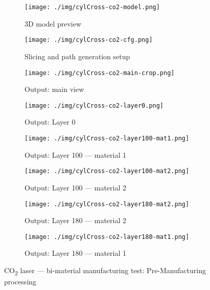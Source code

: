 \begin{figure}[htbp!]
  \centering
  \begin{subfigure}[t]{0.48\textwidth}
  \centering
  \texttt{[image: ./img/cylCross-co2-model.png]}
  \caption{3D model preview}%
  \label{fig:cylCross-co2-model}
  \end{subfigure}
%
  \begin{subfigure}[t]{0.48\textwidth}
  \centering
  \texttt{[image: ./img/cylCross-co2-cfg.png]}
  \caption{Slicing and path generation setup}%
  \label{fig:cylCross-co2-cfg}
\end{subfigure}
%
  \begin{subfigure}[t]{0.48\textwidth}
  \centering
  \texttt{[image: ./img/cylCross-co2-main-crop.png]}
  \caption{Output: main view}%
  \label{fig:cylCross-co2-main}
\end{subfigure}
%
  \begin{subfigure}[t]{0.48\textwidth}
  \centering
  \texttt{[image: ./img/cylCross-co2-layer0.png]}
  \caption{Output: Layer 0}%
  \label{fig:cylCross-co2-layer0}
\end{subfigure}
%
  \begin{subfigure}[t]{0.48\textwidth}
  \centering
  \texttt{[image: ./img/cylCross-co2-layer100-mat1.png]}
  \caption{Output: Layer 100 --- material 1}%
  \label{fig:cylCross-co2-layer100-mat1}
\end{subfigure}
%
%
  \begin{subfigure}[t]{0.48\textwidth}
  \centering
  \texttt{[image: ./img/cylCross-co2-layer100-mat2.png]}
  \caption{Output: Layer 100 --- material 2}%
  \label{fig:cylCross-co2-layer100-mat2}
\end{subfigure}
%
  \begin{subfigure}[t]{0.48\textwidth}
  \centering
  \texttt{[image: ./img/cylCross-co2-layer180-mat2.png]}
  \caption{Output: Layer 180 --- material 2}%
  \label{fig:cylCross-co2-layer180-mat2}
\end{subfigure}
%
  \begin{subfigure}[t]{0.48\textwidth}
  \centering
  \texttt{[image: ./img/cylCross-co2-layer180-mat1.png]}
  \caption{Output: Layer 180 --- material 1}%
  \label{fig:cylCross-co2-layer180-mat1}
\end{subfigure}
  \caption{CO\textsubscript{2} laser --- bi-material manufacturing test: Pre-Manufacturing
  processing}%
  \label{fig:cylCross-co2-test}
\end{figure}

